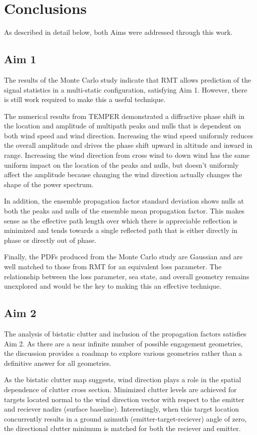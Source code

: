 \renewcommand{\baselinestretch}{2} \small\normalsize
\section{Conclusions}
As described in detail below, both Aims were addressed through this work.

\subsection{Aim 1}
The results of the Monte Carlo study indicate that RMT allows prediction of the signal statistics in a multi-static configuration, satisfying Aim 1. However, there is still work required to make this a useful technique. 

The numerical results from TEMPER demonstrated a diffractive phase shift in the location and amplitude of multipath peaks and nulls that is dependent on both wind speed and wind direction. Increasing the wind speed uniformly reduces the overall amplitude and drives the phase shift upward in altitude and inward in range. Increasing the wind direction from cross wind to down wind has the same uniform impact on the location of the peaks and nulls, but doesn't uniformly affect the amplitude because changing the wind direction actually changes the shape of the power spectrum.

In addition, the ensemble propagation factor standard deviation shows nulls at both the peaks and nulls of the ensemble mean propagation factor. This makes sense as the effective path length over which there is appreciable reflection is minimized and tends towards a single reflected path that is either directly in phase or directly out of phase.

Finally, the PDFs produced from the Monte Carlo study are Gaussian and are well matched to those from RMT for an equivalent loss parameter. The relationship between the loss parameter, sea state, and overall geometry remains unexplored and would be the key to making this an effective technique. 

\subsection{Aim 2}
The analysis of bistatic clutter and inclusion of the propagation factors satisfies Aim 2. As there are a near infinite number of possible engagement geometries, the discussion provides a roadmap to explore various geometries rather than a definitive answer for all geometries.

As the bistatic clutter map suggests, wind direction plays a role in the spatial dependence of clutter cross section. Minimized clutter levels are achieved for targets located normal to the wind direction vector with respect to the emitter and reciever nadirs (surface baseline). Interestingly, when this target location concurrently results in a ground azimuth (emitter-target-reciever) angle of zero, the directional clutter minimum is matched for both the reciever and emitter.